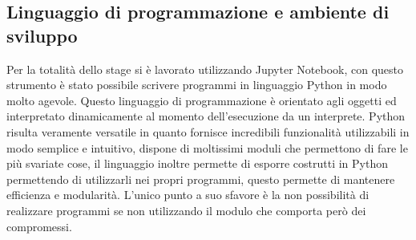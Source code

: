 \subsection{Linguaggio di programmazione e ambiente di sviluppo}
Per la totalità dello stage si è lavorato utilizzando Jupyter Notebook, con questo strumento è stato possibile scrivere programmi in linguaggio Python in modo molto agevole. Questo linguaggio di programmazione è orientato agli oggetti ed interpretato dinamicamente al momento dell’esecuzione da un interprete. Python risulta veramente versatile in quanto fornisce incredibili funzionalità utilizzabili in modo semplice e intuitivo, dispone di moltissimi moduli che permettono di fare le più svariate cose, il linguaggio inoltre permette di esporre costrutti  in Python permettendo di utilizzarli nei propri programmi, questo permette di mantenere efficienza e modularità. L'unico punto a suo sfavore è la non possibilità di realizzare programmi  se non utilizzando il modulo  che comporta però dei compromessi.
	
